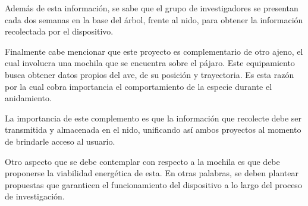 Además de esta información, se sabe que el grupo de investigadores se presentan cada dos semanas en la base del árbol, frente al nido, para obtener la información recolectada por el dispositivo.

Finalmente cabe mencionar que este proyecto es complementario de otro ajeno, el cual involucra una mochila que se encuentra sobre el pájaro. Este equipamiento busca obtener datos propios del ave, de su posición y trayectoria. Es esta razón por la cual cobra importancia el comportamiento de la especie durante el anidamiento.

La importancia de este complemento es que la información que recolecte debe ser transmitida y almacenada en el nido, unificando así ambos proyectos al momento de brindarle acceso al usuario. 

Otro aspecto que se debe contemplar con respecto a la mochila es que debe proponerse la viabilidad energética de esta. En otras palabras, se deben plantear propuestas que garanticen el funcionamiento del dispositivo a lo largo del proceso de investigación.

%